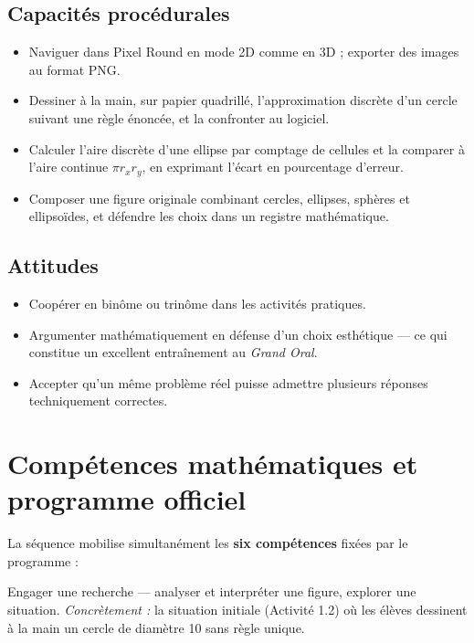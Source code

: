 \documentclass[12pt,a4paper]{scrartcl}
\newcommand{\acc}[1]{\textcolor{accent}{\textbf{#1}}}
\begin{document}
\subsection{Capacités procédurales}

\begin{itemize}[leftmargin=1.3em,itemsep=0.15em,topsep=0.3em]
  \item Naviguer dans Pixel Round en mode 2D comme en 3D ; exporter des images au format PNG.
  \item Dessiner à la main, sur papier quadrillé, l'approximation discrète d'un cercle suivant une règle énoncée, et la confronter au logiciel.
  \item Calculer l'aire discrète d'une ellipse par comptage de cellules et la comparer à l'aire continue $\pi r_x r_y$, en exprimant l'écart en pourcentage d'erreur.
  \item Composer une figure originale combinant cercles, ellipses, sphères et ellipsoïdes, et défendre les choix dans un registre mathématique.
\end{itemize}

\subsection{Attitudes}

\begin{itemize}[leftmargin=1.3em,itemsep=0.15em,topsep=0.3em]
  \item Coopérer en binôme ou trinôme dans les activités pratiques.
  \item Argumenter mathématiquement en défense d'un choix esthétique --- ce qui constitue un excellent entraînement au \emph{Grand Oral}.
  \item Accepter qu'un même problème réel puisse admettre plusieurs réponses techniquement correctes.
\end{itemize}

\section{Compétences mathématiques et programme officiel}

La séquence mobilise simultanément les \acc{six compétences} fixées par le programme :

\begin{competence}[Chercher]
Engager une recherche --- analyser et interpréter une figure, explorer une situation. \emph{Concrètement :} la situation initiale (Activité 1.2) où les élèves dessinent à la main un cercle de diamètre 10 sans règle unique.
\end{competence}
\end{document}
